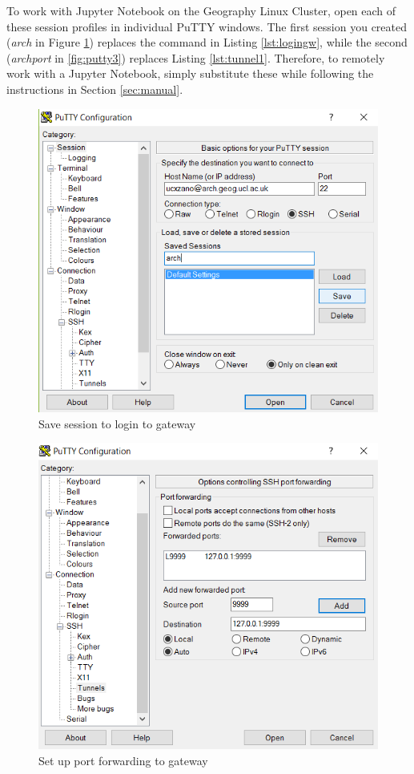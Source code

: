 \documentclass[a4paper]{article}
\begin{document}
To work with Jupyter Notebook on the Geography Linux Cluster, open each of these session profiles in individual PuTTY windows.
The first session you created (\emph{arch} in Figure \ref{fig:putty1}) replaces the command in Listing \ref{lst:logingw}, while the second (\emph{archport} in \ref{fig:putty3}) replaces Listing \ref{lst:tunnel1}.
Therefore, to remotely work with a Jupyter Notebook, simply substitute these while following the instructions in Section \ref{sec:manual}.


\begin{figure}[p]
  \centering
    \includegraphics[width=\textwidth]{figures/putty1_save_login_session.png}
  \caption{Save session to login to gateway}
  \label{fig:putty1}
\end{figure}

\begin{figure}[p]
  \centering
    \includegraphics[width=\textwidth]{figures/putty2_setup_tunnel.png}
  \caption{Set up port forwarding to gateway}
  \label{fig:putty2}
\end{figure}
\end{document}
